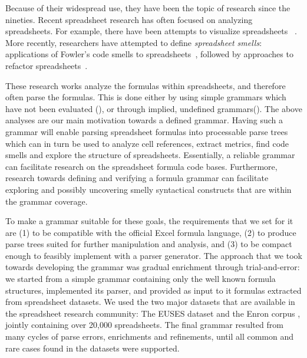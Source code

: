 \documentclass[conference]{IEEEtran}
\begin{document}
Because of their widespread use, they have been the topic of research since the nineties\cite{DBLP:journals/sigplan/BellP93}. Recent spreadsheet research has often focused on analyzing spreadsheets. For example, there have been attempts to visualize spreadsheets ~\cite{DBLP:conf/icse/HermansPD11, Shio1999}. More recently, researchers have attempted to define \emph{spreadsheet smells}: applications of Fowler's code smells to spreadsheets~\cite{DBLP:conf/icse/HermansPD12, DBLP:conf/icsm/Hermans212}, followed by approaches to refactor spreadsheets~\cite{hermans2014bumblebee,badame2012refactoring}.

These research works analyze the formulas within spreadsheets, and therefore often parse the formulas. This is done either by using simple grammars which have not been evaluated (\cite{badame2012refactoring}), or through implied, undefined grammars(\cite{DBLP:conf/icse/HermansPD11,DBLP:conf/icse/HermansPD12, DBLP:conf/icsm/Hermans212, hermans2014bumblebee}). The above analyses are our main motivation towards a defined grammar. Having such a grammar will enable parsing spreadsheet formulas into processable parse trees which can in turn be used to analyze cell references, extract metrics, find code smells and explore the structure of spreadsheets. Essentially, a reliable grammar can facilitate research on the spreadsheet formula code bases. Furthermore, research towards defining and verifying a formula grammar can facilitate exploring and possibly uncovering smelly syntactical constructs that are within the grammar coverage.

To make a grammar suitable for these goals, the requirements that we set for it are (1) to be compatible with the official Excel formula language, (2) to produce parse trees suited for further manipulation and analysis, and (3) to be compact enough to feasibly implement with a parser generator. The approach that we took towards developing the grammar was gradual enrichment through trial-and-error: we started from a simple grammar containing only the well known formula structures, implemented its parser, and provided as input to it formulas extracted from spreadsheet datasets. We used the two major datasets that are available in the spreadsheet research community: The EUSES dataset \cite{euses} and the Enron corpus \cite{enron}, jointly containing over 20,000 spreadsheets. The final grammar resulted from many cycles of parse errors, enrichments and refinements, until all common and rare cases found in the datasets were supported.
\end{document}
